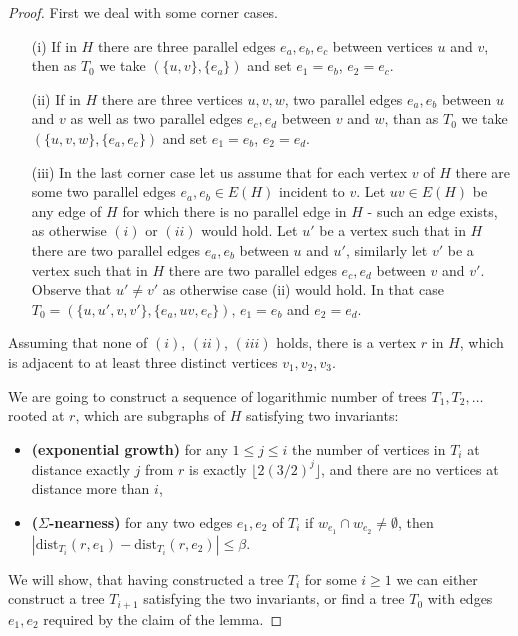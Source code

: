 \documentclass[11pt]{article}
\theoremstyle{definition}
\newcommand{\dist}{\mathrm{dist}}
\begin{document}
\begin{proof}
First we deal with some corner cases. 
\begin{itemize}
\item[(i)] If in $H$ there are three parallel edges $e_a,e_b,e_c$ between vertices $u$ and $v$,
then as $T_0$ we take $(\{u,v\},\{e_a\})$ and set $e_1 = e_b$, $e_2 = e_c$.
\item[(ii)] If in $H$ there are three vertices $u,v,w$, two parallel edges $e_a, e_b$ between $u$ and $v$
as well as two parallel edges $e_c,e_d$ between $v$ and $w$, 
than as $T_0$ we take $(\{u,v,w\}, \{e_a,e_c\})$ and set $e_1=e_b$, $e_2 = e_d$.
\item[(iii)] In the last corner case let us assume that for each vertex $v$ of $H$
there are some two parallel edges $e_a, e_b \in E(H)$ incident to $v$.
Let $uv \in E(H)$ be any edge of $H$ for which there is no parallel edge in $H$ -
such an edge exists, as otherwise $(i)$ or $(ii)$ would hold.
Let $u'$ be a vertex such that in $H$ there are two parallel edges $e_a,e_b$ between $u$ and $u'$,
similarly let $v'$ be a vertex such that in $H$ there are two parallel edges $e_c,e_d$ between $v$ and $v'$.
Observe that $u'\neq v'$ as otherwise case (ii) would hold.
In that case $T_0=(\{u,u',v,v'\},\{e_a,uv,e_c\})$, $e_1 = e_b$ and $e_2 = e_d$.
\end{itemize}
Assuming that none of $(i)$, $(ii)$, $(iii)$ holds,
there is a vertex $r$ in $H$, which is adjacent to at least three distinct vertices $v_1,v_2,v_3$.

We are going to construct a sequence of logarithmic number of trees $T_1, T_2, \ldots$ rooted at $r$, which are subgraphs of $H$ satisfying two invariants:
\begin{itemize}
  \item {\bf (exponential growth)} for any $1 \le j \le i$ the number of vertices in $T_i$
  at distance exactly $j$ from $r$ is exactly $\lfloor 2(3/2)^j \rfloor$,
  and there are no vertices at distance more than $i$,
  \item{\bf ($\Sigma$-nearness)} for any two edges $e_1,e_2$ of $T_i$ if $w_{e_1} \cap w_{e_2} \neq \emptyset$,
  then $|\dist_{T_i}(r,e_1) - \dist_{T_i}(r,e_2)| \le \beta$.
\end{itemize}
We will show, that having constructed a tree $T_i$ for some $i \ge 1$ we
can either construct a tree $T_{i+1}$ satisfying the two invariants,
or find a tree $T_0$ with edges $e_1,e_2$ required by the claim of the lemma.


\end{proof}
\end{document}
